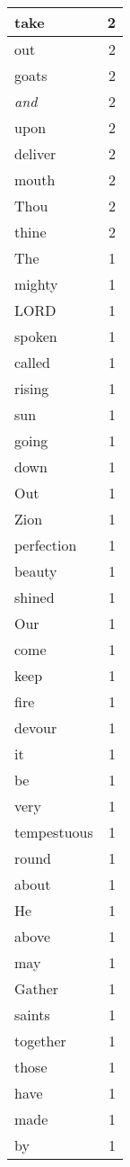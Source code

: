 \begin{center}
\begin{longtable}{l|r}
take & 2 \\ \hline
out & 2 \\ \hline
goats & 2 \\ \hline
\emph{and} & 2 \\ \hline
upon & 2 \\ \hline
deliver & 2 \\ \hline
mouth & 2 \\ \hline
Thou & 2 \\ \hline
thine & 2 \\ \hline
The & 1 \\ \hline
mighty & 1 \\ \hline
LORD & 1 \\ \hline
spoken & 1 \\ \hline
called & 1 \\ \hline
rising & 1 \\ \hline
sun & 1 \\ \hline
going & 1 \\ \hline
down & 1 \\ \hline
Out & 1 \\ \hline
Zion & 1 \\ \hline
perfection & 1 \\ \hline
beauty & 1 \\ \hline
shined & 1 \\ \hline
Our & 1 \\ \hline
come & 1 \\ \hline
keep & 1 \\ \hline
fire & 1 \\ \hline
devour & 1 \\ \hline
it & 1 \\ \hline
be & 1 \\ \hline
very & 1 \\ \hline
tempestuous & 1 \\ \hline
round & 1 \\ \hline
about & 1 \\ \hline
He & 1 \\ \hline
above & 1 \\ \hline
may & 1 \\ \hline
Gather & 1 \\ \hline
saints & 1 \\ \hline
together & 1 \\ \hline
those & 1 \\ \hline
have & 1 \\ \hline
made & 1 \\ \hline
by & 1 \\ \hline

\end{longtable}
\end{center}
